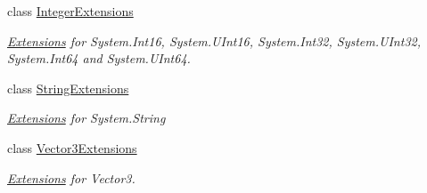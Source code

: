 \begin{DoxyCompactItemize}
class \hyperlink{class_tri_devs_1_1_tri_engine2_d_1_1_extensions_1_1_integer_extensions}{Integer\-Extensions}
\begin{DoxyCompactList}\small\item\em \hyperlink{namespace_tri_devs_1_1_tri_engine2_d_1_1_extensions}{Extensions} for System.\-Int16, System.\-U\-Int16, System.\-Int32, System.\-U\-Int32, System.\-Int64 and System.\-U\-Int64. \end{DoxyCompactList}\item 
class \hyperlink{class_tri_devs_1_1_tri_engine2_d_1_1_extensions_1_1_string_extensions}{String\-Extensions}
\begin{DoxyCompactList}\small\item\em \hyperlink{namespace_tri_devs_1_1_tri_engine2_d_1_1_extensions}{Extensions} for System.\-String \end{DoxyCompactList}\item 
class \hyperlink{class_tri_devs_1_1_tri_engine2_d_1_1_extensions_1_1_vector3_extensions}{Vector3\-Extensions}
\begin{DoxyCompactList}\small\item\em \hyperlink{namespace_tri_devs_1_1_tri_engine2_d_1_1_extensions}{Extensions} for Vector3. \end{DoxyCompactList}\end{DoxyCompactItemize}
